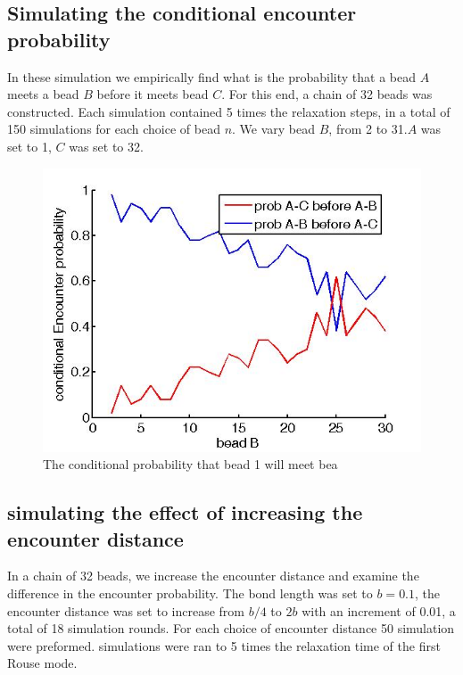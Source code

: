 \documentclass[12pt]{paper}
\begin{document}
\subsection{Simulating the conditional encounter probability}
In these simulation we empirically find what is the probability that a bead $A$ meets a bead $B$ before it meets bead $C$. For this end, a chain of 32 beads was constructed. Each simulation contained 5 times the relaxation steps, in a total of 150 simulations for each choice of bead $n$. We vary bead $B$, from 2 to 31.$A$ was set to 1, $C$ was set to 32.

\begin{figure}[H]\label{conditionalEncounterProb32BeadsVaryBead2From2To31}
\includegraphics[scale=0.3]{conditionalEncounterProb32BeadsVaryBead2From2To31}
\caption{\scriptsize{The conditional probability that bead 1 will meet bea}}
\end{figure}

\subsection{simulating the effect of increasing the encounter distance}
In a chain of 32 beads, we increase the encounter distance and examine the difference in the encounter probability. 
The bond length was set to $b=0.1$, the encounter distance was set to increase from $b/4$ to $2b$ with an increment of 0.01, a total of 18 simulation rounds. For each choice of encounter distance 50 simulation were preformed. simulations were ran to 5 times the relaxation time of the first Rouse mode. 
\end{document}
